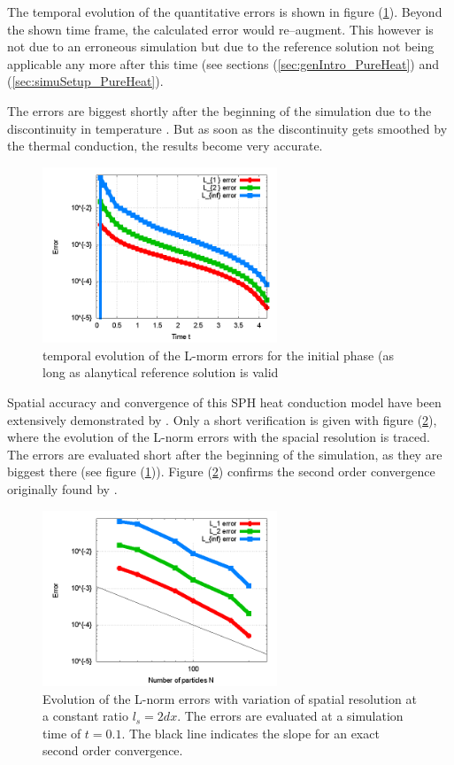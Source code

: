 \documentclass[11pt,a4paper,twoside]{report}
\begin{document}
The temporal evolution of the quantitative errors is shown in figure (\ref{fig:PureHeat_temporalErrorEvolution}). Beyond the shown time frame, the calculated error would re--augment. This however is not due to an erroneous simulation but due to the reference solution not being applicable any more after this time (see sections (\ref{sec:genIntro_PureHeat}) and (\ref{sec:simuSetup_PureHeat}). 

The errors are biggest shortly after the beginning of the simulation due to the discontinuity in temperature \cite{Cleary1999}. But as soon as the discontinuity gets smoothed by the thermal conduction, the results become very accurate.

\begin{figure}[h]  
  \label{fig:PureHeat_temporalErrorEvolution}
  \centering
  \includegraphics[width=7cm]{Graphics/results/PureHeatConduction/temporalErrEvolution}
  \caption{temporal evolution of the L-morm errors for the initial phase (as long as alanytical reference solution is valid}
\end{figure}


Spatial accuracy and convergence of this SPH heat conduction model have been extensively demonstrated by \cite{Cleary1999}. Only a short verification is given with figure (\ref{fig:PureHeat_ErrorResolution}), where the evolution of the L-norm errors with the spacial resolution is traced. The errors are evaluated short after the beginning of the simulation, as they are biggest there (see figure (\ref{fig:PureHeat_temporalErrorEvolution})). Figure (\ref{fig:PureHeat_ErrorResolution}) confirms the second order convergence originally found by \cite{Cleary1999}.

\begin{figure}[h]  
  \label{fig:PureHeat_ErrorResolution}
  \centering
  \includegraphics[width=7cm]{Graphics/results/PureHeatConduction/ErrorResolution}
  \caption{Evolution of the L-norm errors with variation of spatial resolution at a constant ratio $l_s=2dx$. The errors are evaluated at a simulation time of $t=0.1$. The black line indicates the slope for an exact second order convergence.}
\end{figure}
\end{document}
